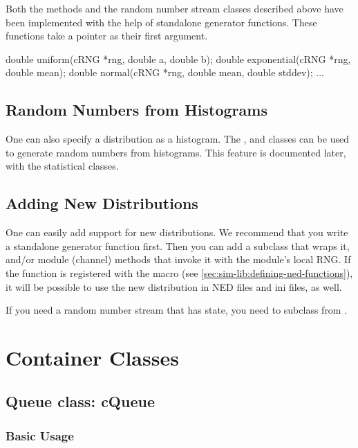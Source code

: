 Both the  methods and the random number stream classes
described above have been implemented with the help of standalone generator
functions. These functions take a  pointer as their first
argument.

\begin{cpp}
double uniform(cRNG *rng, double a, double b);
double exponential(cRNG *rng, double mean);
double normal(cRNG *rng, double mean, double stddev);
...
\end{cpp}

\subsection{Random Numbers from Histograms}
\label{sec:sim-lib:random-numbers-from-histograms}

One can also specify a distribution as a histogram.
The ,  and  classes
can be used to generate random numbers from histograms. This feature is
documented later, with the statistical classes.

\subsection{Adding New Distributions}
\label{sec:sim-lib:adding-new-distributions}

One can easily add support for new distributions. We recommend that
you write a standalone generator function first. Then you can add
a  subclass that wraps it, and/or module (channel)
methods that invoke it with the module's local RNG.
If the function is registered with the 
macro (see \ref{sec:sim-lib:defining-ned-functions}), it will be
possible to use the new distribution in NED files and ini files, as well.

If you need a random number stream that has state, you need to
subclass from .


\section{Container Classes}
\label{sec:sim-lib:container-classes}

\subsection{Queue class: cQueue}
\label{sec:sim-lib:cqueue}

\subsubsection{Basic Usage}
\label{sec:sim-lib:cqueue-basic-usage}

